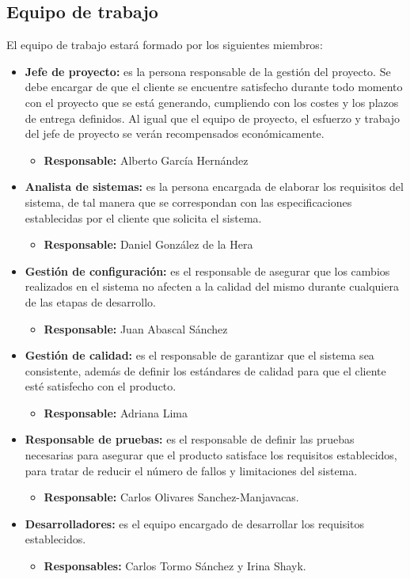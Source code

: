 \subsection{Equipo de trabajo}
\par El equipo de trabajo estará formado por los siguientes miembros:
\begin{itemize}
\item \textbf{Jefe de proyecto:} es la persona responsable de la gestión del proyecto. Se debe encargar de que el cliente se encuentre satisfecho durante todo momento con el proyecto que se está generando, cumpliendo con los costes y los plazos de entrega definidos. Al igual que el equipo de proyecto, el esfuerzo y trabajo del jefe de proyecto se verán recompensados económicamente.
  \begin{itemize}
  \item \textbf{Responsable:} Alberto García Hernández
  \end{itemize}
\item \textbf{Analista de sistemas:} es la persona encargada de elaborar los requisitos del sistema, de tal manera que se correspondan con las especificaciones establecidas por el cliente que solicita el sistema.
  \begin{itemize}
  \item \textbf{Responsable:} Daniel González de la Hera
  \end{itemize}
\item \textbf{Gestión de configuración:} es el responsable de asegurar que los cambios realizados en el sistema no afecten a la calidad del mismo durante cualquiera de las etapas de desarrollo.
  \begin{itemize}
  \item \textbf{Responsable:} Juan Abascal Sánchez
  \end{itemize}
\item \textbf{Gestión de calidad:} es el responsable de garantizar que el sistema sea consistente, además de definir los estándares de calidad para que el cliente esté satisfecho con el producto.
  \begin{itemize}
  \item \textbf{Responsable:} Adriana Lima
  \end{itemize}
\item \textbf{Responsable de pruebas:} es el responsable de definir las pruebas necesarias para asegurar que el producto satisface los requisitos establecidos, para tratar de reducir el número de fallos y limitaciones del sistema.
  \begin{itemize}
  \item \textbf{Responsable:} Carlos Olivares Sanchez-Manjavacas.
  \end{itemize}
\item \textbf{Desarrolladores:} es el equipo encargado de desarrollar los requisitos establecidos.
  \begin{itemize}
  \item \textbf{Responsables:} Carlos Tormo Sánchez y Irina Shayk.
  \end{itemize}
\end{itemize}

